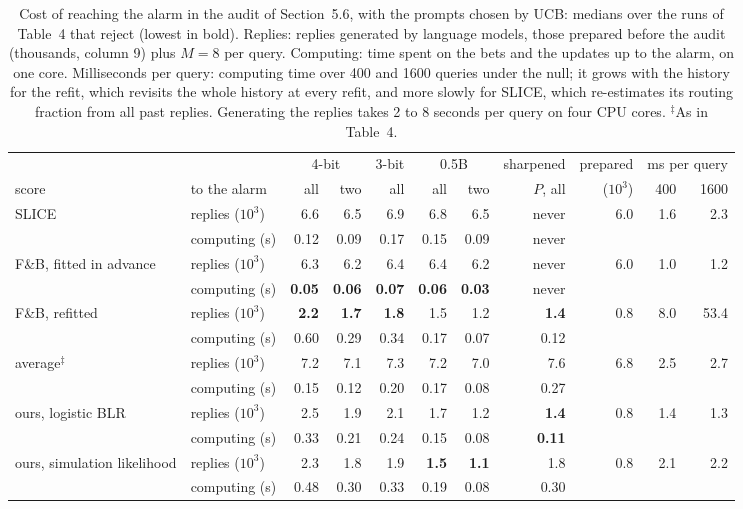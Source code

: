 \documentclass[11pt]{article}
\theoremstyle{remark}
\begin{document}
\begin{table}[H]
\centering
\caption{Cost of reaching the alarm in the audit of
Section~5.6, with the prompts chosen by UCB: medians over the
runs of Table~4 that reject (lowest in bold). Replies: replies
generated by language models, those prepared before the audit (thousands,
column 9) plus $M = 8$ per query. Computing: time spent on the bets and the
updates up to the alarm, on one core. Milliseconds per query: computing time
over 400 and 1600 queries under the null; it grows with the history for the
refit, which revisits the whole history at every refit, and more slowly for
SLICE, which re-estimates its routing fraction from all past replies.
Generating the replies takes 2 to 8 seconds per query on four CPU cores.
$^\ddagger$As in Table~4.}
\label{tab:llmcost}
\small
\setlength{\tabcolsep}{4pt}
\begin{adjustbox}{max width=\textwidth}
\begin{tabular}{llrrrrrrrrr}
\toprule
 & & \multicolumn{2}{c}{4-bit} & 3-bit & \multicolumn{2}{c}{0.5B} & sharpened & prepared & \multicolumn{2}{c}{ms per query} \\
\cmidrule(lr){3-4}\cmidrule(lr){5-5}\cmidrule(lr){6-7}\cmidrule(lr){8-8}\cmidrule(lr){10-11}
score & to the alarm & all & two & all & all & two & $P$, all & ($10^3$) & 400 & 1600 \\
\midrule
SLICE & replies ($10^3$) & 6.6 & 6.5 & 6.9 & 6.8 & 6.5 & never & 6.0 & 1.6 & 2.3 \\
 & computing (s) & 0.12 & 0.09 & 0.17 & 0.15 & 0.09 & never & & & \\
\addlinespace[3pt]
F\&B, fitted in advance & replies ($10^3$) & 6.3 & 6.2 & 6.4 & 6.4 & 6.2 & never & 6.0 & 1.0 & 1.2 \\
 & computing (s) & \textbf{0.05} & \textbf{0.06} & \textbf{0.07} & \textbf{0.06} & \textbf{0.03} & never & & & \\
\addlinespace[3pt]
F\&B, refitted & replies ($10^3$) & \textbf{2.2} & \textbf{1.7} & \textbf{1.8} & 1.5 & 1.2 & \textbf{1.4} & 0.8 & 8.0 & 53.4 \\
 & computing (s) & 0.60 & 0.29 & 0.34 & 0.17 & 0.07 & 0.12 & & & \\
\addlinespace[3pt]
average$^\ddagger$ & replies ($10^3$) & 7.2 & 7.1 & 7.3 & 7.2 & 7.0 & 7.6 & 6.8 & 2.5 & 2.7 \\
 & computing (s) & 0.15 & 0.12 & 0.20 & 0.17 & 0.08 & 0.27 & & & \\
\addlinespace[3pt]
ours, logistic BLR & replies ($10^3$) & 2.5 & 1.9 & 2.1 & 1.7 & 1.2 & \textbf{1.4} & 0.8 & 1.4 & 1.3 \\
 & computing (s) & 0.33 & 0.21 & 0.24 & 0.15 & 0.08 & \textbf{0.11} & & & \\
\addlinespace[3pt]
ours, simulation likelihood & replies ($10^3$) & 2.3 & 1.8 & 1.9 & \textbf{1.5} & \textbf{1.1} & 1.8 & 0.8 & 2.1 & 2.2 \\
 & computing (s) & 0.48 & 0.30 & 0.33 & 0.19 & 0.08 & 0.30 & & & \\
\bottomrule
\end{tabular}
\end{adjustbox}
\end{table}
\end{document}
